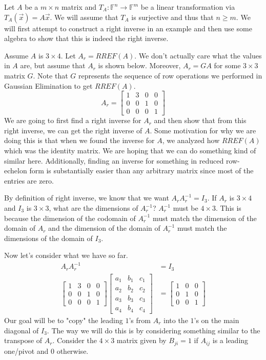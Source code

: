Let $A$ be a $m\times n$ matrix and $T_A:\mathbb{F}^n\to \mathbb{F}^m$ be a linear transformation via $T_A(\vec{x})=A\vec{x}$. We will assume that $T_A$ is surjective and thus that $n\geq m$. We will first attempt to construct a right inverse in an example and then use some algebra to show that this is indeed the right inverse.
\begin{example}
    Assume $A$ is $3\times 4$. Let $A_r=RREF(A)$. We don't actually care what the values in $A$ are, but assume that $A_r$ is shown below. Moreover, $A_r=GA$ for some $3\times 3$ matrix $G$. Note that $G$ represents the sequence of row operations we performed in Gaussian Elimination to get $RREF(A)$.
    $$A_r=\begin{bmatrix}
        1 & 3 & 0 & 0\\
        0 & 0 & 1 & 0\\
        0 & 0 & 0 &1
    \end{bmatrix}$$
    We are going to first find a right inverse for $A_r$ and then show that from this right inverse, we can get the right inverse of $A$. Some motivation for why we are doing this is that when we found the inverse for $A$, we analyzed how $RREF(A)$ which was the identity matrix. We are hoping that we can do something kind of similar here. Additionally, finding an inverse for something in reduced row-echelon form is substantially easier than any arbitrary matrix since most of the entries are zero.
    
    By definition of right inverse, we know that we want $A_rA_r^{-1}=I_3$. If $A_r$ is $3\times 4$ and $I_3$ is $3\times 3$, what are the dimensions of $A_r^{-1}$? $A_r^{-1}$ must be $4\times 3$. This is because the dimension of the codomain of $A_r^{-1}$ must match the dimension of the domain of $A_r$ and the dimension of the domain of $A_r^{-1}$ must match the dimensions of the domain of $I_3$.

    Now let's consider what we have so far.
    \begin{align*}
        A_rA_r^{-1}&=I_3\\
        \begin{bmatrix}
        1 & 3 & 0 & 0\\
        0 & 0 & 1 & 0\\
        0 & 0 & 0 &1
    \end{bmatrix}\begin{bmatrix}
        a_1 & b_1 & c_1\\
        a_2 & b_2 & c_2\\
        a_3 & b_3 & c_3\\
        a_4 & b_4 & c_4
    \end{bmatrix}&=\begin{bmatrix}
        1 & 0 & 0\\
        0 & 1 & 0\\
        0 & 0 & 1
    \end{bmatrix}
    \end{align*}
    Our goal will be to "copy" the leading $1$'s from $A_r$ into the $1$'s on the main diagonal of $I_3$. The way we will do this is by considering something similar to the transpose of $A_r$. Consider the $4\times 3$ matrix given by $B_{ji}=1$ if $A_{ij}$ is a leading one/pivot and $0$ otherwise.
    

\end{example}
